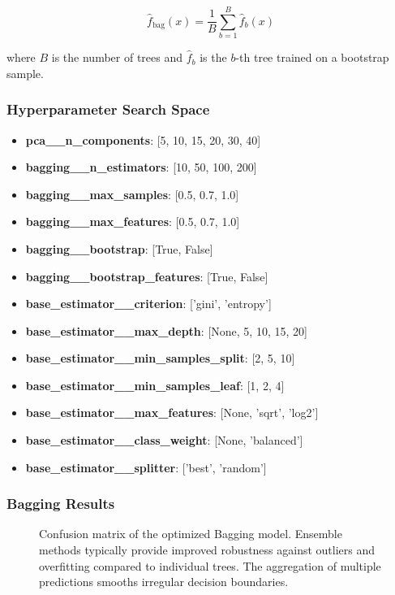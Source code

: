 \documentclass[12pt,a4paper]{article}
\begin{document}
\begin{equation}
\hat{f}_{\text{bag}}(x) = \frac{1}{B} \sum_{b=1}^{B} \hat{f}_b(x)
\end{equation}

where $B$ is the number of trees and $\hat{f}_b$ is the $b$-th tree trained on a bootstrap sample.

\subsubsection{Hyperparameter Search Space}

\begin{itemize}
    \item \textbf{pca\_\_n\_components}: [5, 10, 15, 20, 30, 40]
    \item \textbf{bagging\_\_n\_estimators}: [10, 50, 100, 200]
    \item \textbf{bagging\_\_max\_samples}: [0.5, 0.7, 1.0]
    \item \textbf{bagging\_\_max\_features}: [0.5, 0.7, 1.0]
    \item \textbf{bagging\_\_bootstrap}: [True, False]
    \item \textbf{bagging\_\_bootstrap\_features}: [True, False]
    \item \textbf{base\_estimator\_\_criterion}: ['gini', 'entropy']
    \item \textbf{base\_estimator\_\_max\_depth}: [None, 5, 10, 15, 20]
    \item \textbf{base\_estimator\_\_min\_samples\_split}: [2, 5, 10]
    \item \textbf{base\_estimator\_\_min\_samples\_leaf}: [1, 2, 4]
    \item \textbf{base\_estimator\_\_max\_features}: [None, 'sqrt', 'log2']
    \item \textbf{base\_estimator\_\_class\_weight}: [None, 'balanced']
    \item \textbf{base\_estimator\_\_splitter}: ['best', 'random']
\end{itemize}

\subsubsection{Bagging Results}

\begin{figure}[H]
    \centering
    \caption{Confusion matrix of the optimized Bagging model. Ensemble methods typically provide improved robustness against outliers and overfitting compared to individual trees. The aggregation of multiple predictions smooths irregular decision boundaries.}
    \label{fig:bagging_confusion}
\end{figure}
\end{document}
